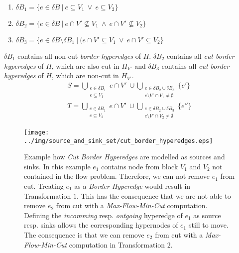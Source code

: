 \begin{enumerate}
\item $\delta B_1 = \{ e \in \delta B \ |\ e \subseteq V_1\ \lor\ e \subseteq V_2 \}$
\item $\delta B_2 = \{ e \in \delta B \ |\ e \cap V' \not\subseteq V_1\ \land\ e \cap V' \not\subseteq V_2\}$
\item $\delta B_3 = \{ e \in \delta B \setminus \delta B_1 \ |\ (e \cap V' \subseteq V_1\ \lor\ e \cap V' \subseteq V_2 \}$
\end{enumerate}

$\delta B_1$ contains all non-cut \emph{border hyperedges} of $H$. $\delta B_2$ contains 
all \emph{cut border hyperedges} of $H$, which are also cut in $H_{V'}$ and $\delta B_3$ contains
all \emph{cut border hyperedges} of $H$, which are non-cut in $H_{V'}$.
\begin{align}
S = \bigcup\limits_{\substack{e \in \delta B_1 \\ e \subseteq V_1}} e\cap V'\ \cup \bigcup\limits_{\substack{e \in \delta B_2 \cup \delta B_3 \\ e \setminus V' \cap V_1 \neq \emptyset}} \{e'\} \label{S_final_border_hyperedges}\\
T = \bigcup\limits_{\substack{e \in \delta B_1 \\ e \subseteq V_2}} e\cap V'\ \cup \bigcup\limits_{\substack{e \in \delta B_2 \cup \delta B_3 \\ e \setminus V' \cap V_2 \neq \emptyset}} \{e''\} \label{T_final_border_hyperedges}
\end{align}

\begin{figure}
\centering
\texttt{[image: ../img/source\_and\_sink\_set/cut\_border\_hyperedges.eps]}
\caption{Example how \emph{Cut Border Hyperedges} are modelled as sources and sinks. In this
         example $e_1$ contains node from block $V_1$ and $V_2$ not contained in the flow problem. Therefore,
         we can not remove $e_1$ from cut. Treating $e_1$ as a \emph{Border Hyperedge} would result
         in Transformation $1$. This has the consequence that we are not able to remove $e_2$
         from cut with a \emph{Max-Flow-Min-Cut} computation. Defining the \emph{incomming} resp.
         \emph{outgoing} hyperedge of $e_1$ as source resp. sinks allows the corresponding hypernodes
         of $e_1$ still to move. The consequence is that we can remove $e_2$ from cut with a
         \emph{Max-Flow-Min-Cut} computation in Transformation $2$.}
\label{img:cut_border_hyperedges}
\end{figure}

